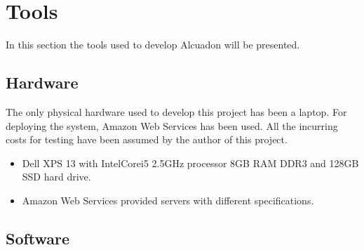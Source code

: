 \section{Tools}

In this section the tools used to develop Alcuadon will be presented.

\subsection{Hardware}

The only physical hardware used to develop this project has been a laptop. For
deploying the system, Amazon Web Services has been used. All the incurring costs
for testing have been assumed by the author of this project.

\begin{itemize}
  \item Dell XPS 13 with Intel\textregistered Core\texttrademark i5 2.5GHz
    processor 8GB RAM DDR3 and 128GB SSD hard drive.
  \item Amazon Web Services provided servers with different specifications.
\end{itemize}

\subsection{Software}

